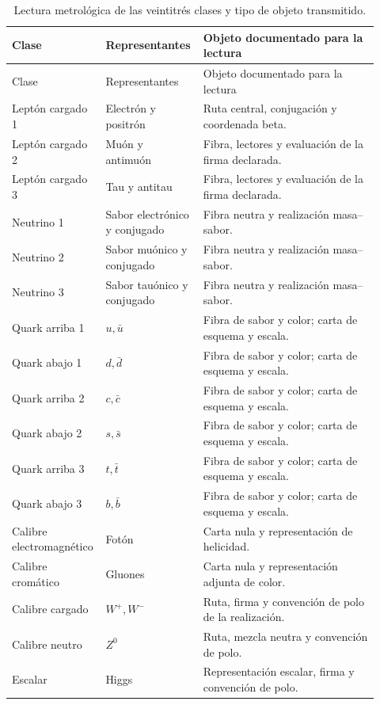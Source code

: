 \begingroup
\small
\setlength{\tabcolsep}{3pt}
\begin{longtable}{p{0.20\linewidth}p{0.25\linewidth}p{0.47\linewidth}}
\caption{Lectura metrológica de las veintitrés clases y tipo de objeto transmitido.}
\label{tab:vi-clases-metrologia}\\
\toprule
Clase & Representantes & Objeto documentado para la lectura\\
\midrule
\endfirsthead
\toprule
Clase & Representantes & Objeto documentado para la lectura\\
\midrule
\endhead
\bottomrule
\endfoot
Leptón cargado 1 & Electrón y positrón & Ruta central, conjugación y coordenada beta.\\
Leptón cargado 2 & Muón y antimuón & Fibra, lectores y evaluación de la firma declarada.\\
Leptón cargado 3 & Tau y antitau & Fibra, lectores y evaluación de la firma declarada.\\
Neutrino 1 & Sabor electrónico y conjugado & Fibra neutra y realización masa--sabor.\\
Neutrino 2 & Sabor muónico y conjugado & Fibra neutra y realización masa--sabor.\\
Neutrino 3 & Sabor tauónico y conjugado & Fibra neutra y realización masa--sabor.\\
Quark arriba 1 & \(u,\bar u\) & Fibra de sabor y color; carta de esquema y escala.\\
Quark abajo 1 & \(d,\bar d\) & Fibra de sabor y color; carta de esquema y escala.\\
Quark arriba 2 & \(c,\bar c\) & Fibra de sabor y color; carta de esquema y escala.\\
Quark abajo 2 & \(s,\bar s\) & Fibra de sabor y color; carta de esquema y escala.\\
Quark arriba 3 & \(t,\bar t\) & Fibra de sabor y color; carta de esquema y escala.\\
Quark abajo 3 & \(b,\bar b\) & Fibra de sabor y color; carta de esquema y escala.\\
Calibre electromagnético & Fotón & Carta nula y representación de helicidad.\\
Calibre cromático & Gluones & Carta nula y representación adjunta de color.\\
Calibre cargado & \(W^+,W^-\) & Ruta, firma y convención de polo de la realización.\\
Calibre neutro & \(Z^0\) & Ruta, mezcla neutra y convención de polo.\\
Escalar & Higgs & Representación escalar, firma y convención de polo.\\

\end{longtable}
